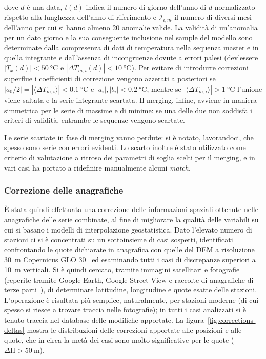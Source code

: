 dove \(d\) è una data, \(t(d)\) indica il numero di giorno dell'anno di \(d\) normalizzato rispetto alla lunghezza dell'anno di riferimento e \(\mathcal{I}_{i,m}\) il numero di diversi mesi dell'anno per cui si hanno almeno 20 anomalie valide. La validità di un'anomalia per un dato giorno e la sua conseguente inclusione nel sample del modello sono determinate dalla compresenza di dati di temperatura nella sequenza master e in quella integrante e dall'assenza di incongruenze dovute a errori palesi (dev'essere \(|T_x(d)| < \qty{50}{\degreeCelsius}\) e \(|\Delta T_{m,i}(d)| < \qty{10}{\degreeCelsius}\)). Per evitare di introdurre correzioni superflue i coefficienti di correzione vengono azzerati a posteriori se \(|a_0/2| = |\langle \Delta T_{m,i} \rangle| < \qty{0.1}{\degreeCelsius}\) e \(|a_i|, |b_i| < \qty{0.2}{\degreeCelsius}\), mentre se \(|\langle \Delta T_{m,i} \rangle| > \qty{1}{\degreeCelsius}\) l'unione viene saltata e la serie integrante scartata. Il merging, infine, avviene in maniera simmetrica per le serie di massime e di minime: se una delle due non soddisfa i criteri di validità, entrambe le sequenze vengono scartate.

Le serie scartate in fase di merging vanno perdute: si è notato, lavorandoci, che spesso sono serie con errori evidenti. Lo scarto inoltre è stato utilizzato come criterio di valutazione a ritroso dei parametri di soglia scelti per il merging, e in vari casi ha portato a ridefinire manualmente alcuni \emph{match}.

\subsubsection{Correzione delle anagrafiche}
È stata quindi effettuata una correzione delle informazioni spaziali ottenute nelle anagrafiche delle serie combinate, al fine di migliorare la qualità delle variabili su cui si basano i modelli di interpolazione geostatistica. Dato l'elevato numero di stazioni ci si è concentrati su un sottoinsieme di casi sospetti, identificati confrontando le quote dichiarate in anagrafica con quelle del DEM a risoluzione \qty{30}{\meter} Copernicus GLO 30~\cite{europeanspaceagencyCopernicusGlobalEuropean2022} ed esaminando tutti i casi di discrepanze superiori a \qty{10}{\meter} verticali. Si è quindi cercato, tramite immagini satellitari e fotografie (reperite tramite Google Earth, Google Street View e raccolte di anagrafiche di terze parti~\cite{associazionelineameteoStazioniReteLinea}), di determinare latitudine, longitudine e quote esatte delle stazioni. L'operazione è risultata più semplice, naturalmente, per stazioni moderne (di cui spesso si riesce a trovare traccia nelle fotografie); in tutti i casi analizzati si è tenuto traccia nel database delle modifiche apportate. La figura~\ref{fig:corrections-deltas} mostra le distribuzioni delle correzioni apportate alle posizioni e alle quote, che in circa la metà dei casi sono molto significative per le quote (\(\Delta \mathrm{H} > \qty{50}{\meter}\)).

